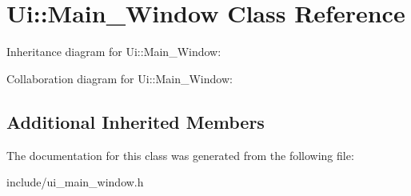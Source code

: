 \hypertarget{class_ui_1_1_main___window}{}\section{Ui\+:\+:Main\+\_\+\+Window Class Reference}
\label{class_ui_1_1_main___window}


Inheritance diagram for Ui\+:\+:Main\+\_\+\+Window\+:


Collaboration diagram for Ui\+:\+:Main\+\_\+\+Window\+:
\subsection*{Additional Inherited Members}


The documentation for this class was generated from the following file\+:\begin{DoxyCompactItemize}
\item 
include/ui\+\_\+main\+\_\+window.\+h\end{DoxyCompactItemize}
